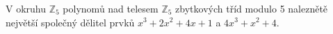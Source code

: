 \subsubsection{}
V okruhu $\mathbb{Z}_{5}$ polynomů nad telesem $\mathbb{Z}_{5}$ zbytkových tříd
modulo 5 naleznětě největší společný dělitel prvků $x^{3}+2x^{2}+4x+1$ a
$4x^{3}+x^{2}+4$.
